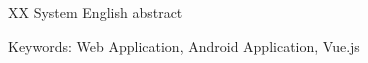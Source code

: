 \begin{englishabstract}
XX System English abstract


\noindent
Keywords: Web Application, Android Application, Vue.js 
\end{englishabstract}

